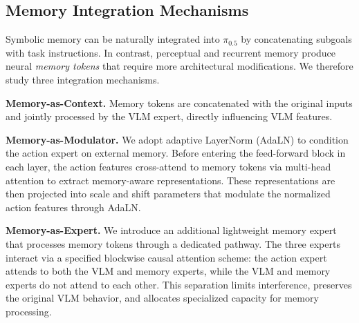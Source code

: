 \subsection{Memory Integration Mechanisms}
Symbolic memory can be naturally integrated into $\pi_{0.5}$  by concatenating subgoals with task instructions. In contrast, perceptual and recurrent memory produce neural \emph{memory tokens} that require more architectural modifications. We therefore study three integration mechanisms.


\noindent\textbf{Memory-as-Context.}
Memory tokens are concatenated with the original inputs and jointly processed by the VLM expert, directly influencing VLM features.

\noindent\textbf{Memory-as-Modulator.}
We adopt adaptive LayerNorm (AdaLN) \cite{peebles2023scalable} to condition the action expert on external memory. Before entering the feed-forward block in each layer, the action features cross-attend to memory tokens via multi-head attention to extract memory-aware representations. These representations are then projected into scale and shift parameters that modulate the normalized action features through AdaLN.

\noindent\textbf{Memory-as-Expert.}
We introduce an additional lightweight memory expert that processes memory tokens through a dedicated pathway. The three experts interact via a specified blockwise causal attention scheme: the action expert attends to both the VLM and memory experts, while the VLM and memory experts do not attend to each other. This separation limits interference, preserves the original VLM behavior, and allocates specialized capacity for memory processing.





